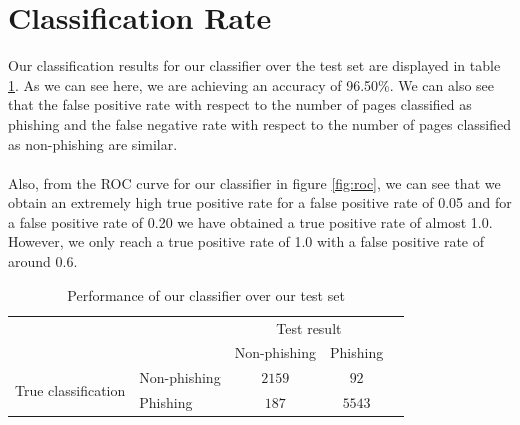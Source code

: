 \documentclass[12pt,twoside]{report}
\begin{document}
\section{Classification Rate}
Our classification results for our classifier over the test set are displayed in table \ref{table:ourconfusionmatrix}. As we can see here, we are achieving an accuracy of 96.50\%. We can also see that the false positive rate with respect to the number of pages classified as phishing and the false negative rate with respect to the number of pages classified as non-phishing are similar. 
\\\\
Also, from the ROC curve for our classifier in figure \ref{fig:roc}, we can see that we obtain an extremely high true positive rate for a false positive rate of 0.05 and for a false positive rate of 0.20 we have obtained a true positive rate of almost 1.0. However, we only reach a true positive rate of 1.0 with a false positive rate of around 0.6.
\begin{table}[h]
\begin{center}
\begin{tabular}{l|l|c|c|c}
\multicolumn{2}{c}{}&\multicolumn{2}{c}{Test result}&\\
\cline{3-4}
\multicolumn{2}{c|}{}&Non-phishing&Phishing\\
\cline{2-4}
\multirow{2}{*}{True classification}& Non-phishing & $2159$ & $92$\\
\cline{2-4}
& Phishing & $187$ & $5543$\\
\cline{2-4}
\end{tabular}
\end{center}
\caption{Performance of our classifier over our test set}
\label{table:ourconfusionmatrix}
\end{table}
\end{document}
